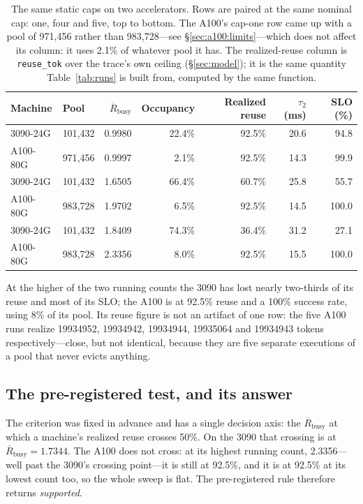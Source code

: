 \begin{table}[t]
  \centering
  \small
  \setlength{\tabcolsep}{4pt}%
  \begin{tabular}{llrrrrr}
    \toprule
    Machine & Pool & $\overline{R}_{\text{busy}}$ & Occupancy & Realized reuse & $\tau_2$ (ms) & SLO (\%) \\
    \midrule
    3090-24G & 101{,}432  & 0.9980 & 22.4\% & 92.5\% & 20.6 & 94.8 \\
    A100-80G & 971{,}456  & 0.9997 &  2.1\% & 92.5\% & 14.3 & 99.9 \\
    \midrule
    3090-24G & 101{,}432  & 1.6505 & 66.4\% & 60.7\% & 25.8 & 55.7 \\
    A100-80G & 983{,}728  & 1.9702 &  6.5\% & 92.5\% & 14.5 & 100.0 \\
    \midrule
    3090-24G & 101{,}432  & 1.8409 & 74.3\% & 36.4\% & 31.2 & 27.1 \\
    A100-80G & 983{,}728  & 2.3356 &  8.0\% & 92.5\% & 15.5 & 100.0 \\
    \bottomrule
  \end{tabular}
  \caption{The same static caps on two accelerators. Rows are paired at the
  same nominal cap: one, four and five, top to bottom. The A100's cap-one row
  came up with a pool of 971{,}456 rather than 983{,}728---see
  \S\ref{sec:a100:limits}---which does not affect its column: it uses 2.1\% of
  whatever pool it has. The realized-reuse column is
  \texttt{reuse\_tok} over the trace's own ceiling (\S\ref{sec:model}); it is
  the same quantity Table~\ref{tab:runs} is built from, computed by the same
  function.}
  \label{tab:a100}
\end{table}

At the higher of the two running counts the 3090 has lost nearly two-thirds of
its reuse and most of its SLO; the A100 is at 92.5\% reuse and a 100\%
success rate, using 8\% of its pool. Its reuse figure is not an artifact of one
row: the five A100 runs realize 19934952, 19934942, 19934944, 19935064 and
19934943 tokens respectively---close, but not identical, because they are five
separate executions of a pool that never evicts anything.

\subsection{The pre-registered test, and its answer}

The criterion was fixed in advance and has a single decision axis: the
$\overline{R}_{\text{busy}}$ at which a machine's realized reuse crosses 50\%.
On the 3090 that crossing is at $\overline{R}_{\text{busy}} = 1.7344$. The A100
does not cross: at its highest running count, 2.3356---well past the 3090's
crossing point---it is still at 92.5\%, and it is at 92.5\% at its lowest
count too, so the whole sweep is flat. The pre-registered rule therefore
returns \emph{supported}.

